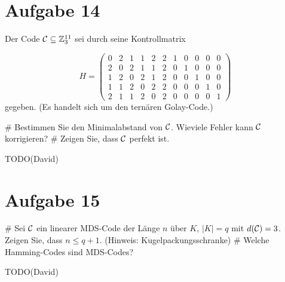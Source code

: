 \section*{Aufgabe 14}
Der Code $\mathcal{C} \subseteq \mathbb{Z}^{11}_3$ sei durch seine Kontrollmatrix

\begin{equation*}
	H =
	\begin{pmatrix}
	0 & 2 & 1 & 1 & 2 & 2 & 1 & 0 & 0 & 0 & 0 \\
	2 & 0 & 2 & 1 & 1 & 2 & 0 & 1 & 0 & 0 & 0 \\
	1 & 2 & 0 & 2 & 1 & 2 & 0 & 0 & 1 & 0 & 0 \\
	1 & 1 & 2 & 0 & 2 & 2 & 0 & 0 & 0 & 1 & 0 \\
	2 & 1 & 1 & 2 & 0 & 2 & 0 & 0 & 0 & 0 & 1
	\end{pmatrix}
\end{equation*}
gegeben.
(Es handelt sich um den ternären Golay-Code.)
\begin{myList}
#
Bestimmen Sie den Minimalabstand von $\mathcal{C}$.
Wieviele Fehler kann $\mathcal{C}$ korrigieren?
#
Zeigen Sie, dass $\mathcal{C}$ perfekt ist.
\end{myList}
TODO(David)

\section*{Aufgabe 15}
\begin{myList}
#
Sei $\mathcal{C}$ ein linearer MDS-Code der Länge $n$ über $K$, $|K| = q$ mit $d(\mathcal{C}) = 3$.
Zeigen Sie, dass $n \leq q + 1$.
(Hinweis: Kugelpackungsschranke)
#
Welche Hamming-Codes sind MDS-Codes?
\end{myList}
TODO(David)

